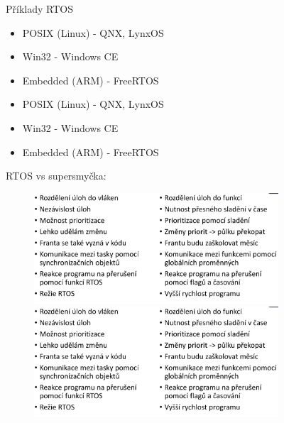 \begin{figure}[h]
Příklady RTOS
\begin{itemize}
  \item POSIX (Linux) - QNX, LynxOS
  \item Win32 - Windows CE
  \item Embedded (ARM) - FreeRTOS
    \item POSIX (Linux) - QNX, LynxOS
    \item Win32 - Windows CE
    \item Embedded (ARM) - FreeRTOS
\end{itemize}

RTOS vs supersmyčka:
\begin{figure}[h]
  \begin{center}
    \includegraphics[width = \textwidth]{img/Picture25.png}
  \end{center}
    \begin{center}
        \includegraphics[width = \textwidth]{img/Picture25.png}
    \end{center}
\end{figure}


\end{figure}
